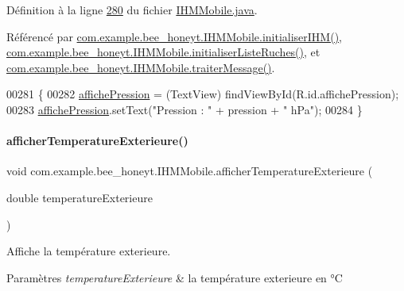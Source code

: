 Définition à la ligne \hyperlink{_i_h_m_mobile_8java_source_l00280}{280} du fichier \hyperlink{_i_h_m_mobile_8java_source}{I\+H\+M\+Mobile.\+java}.



Référencé par \hyperlink{_i_h_m_mobile_8java_source_l00152}{com.\+example.\+bee\+\_\+honeyt.\+I\+H\+M\+Mobile.\+initialiser\+I\+H\+M()}, \hyperlink{_i_h_m_mobile_8java_source_l00170}{com.\+example.\+bee\+\_\+honeyt.\+I\+H\+M\+Mobile.\+initialiser\+Liste\+Ruches()}, et \hyperlink{_i_h_m_mobile_8java_source_l00374}{com.\+example.\+bee\+\_\+honeyt.\+I\+H\+M\+Mobile.\+traiter\+Message()}.


\begin{DoxyCode}
00281     \{
00282         \hyperlink{classcom_1_1example_1_1bee__honeyt_1_1_i_h_m_mobile_a2bc1237c9f17c51c2f506c31fba5b264}{affichePression} = (TextView) findViewById(R.id.affichePression);
00283         \hyperlink{classcom_1_1example_1_1bee__honeyt_1_1_i_h_m_mobile_a2bc1237c9f17c51c2f506c31fba5b264}{affichePression}.setText(\textcolor{stringliteral}{"Pression : "} + pression  + \textcolor{stringliteral}{" hPa"});
00284     \}
\end{DoxyCode}
\mbox{\label{classcom_1_1example_1_1bee__honeyt_1_1_i_h_m_mobile_af7ce50e9cc663c2c9198bbbb2b7882ff}} 
\paragraph{\texorpdfstring{afficher\+Temperature\+Exterieure()}{afficherTemperatureExterieure()}}
{\footnotesize\ttfamily void com.\+example.\+bee\+\_\+honeyt.\+I\+H\+M\+Mobile.\+afficher\+Temperature\+Exterieure (\begin{DoxyParamCaption}\item[{double}]{temperature\+Exterieure }\end{DoxyParamCaption})}



Affiche la température exterieure. 


\begin{DoxyParams}{Paramètres}
{\em temperature\+Exterieure} & la température exterieure en °C \\
\hline
\end{DoxyParams}


